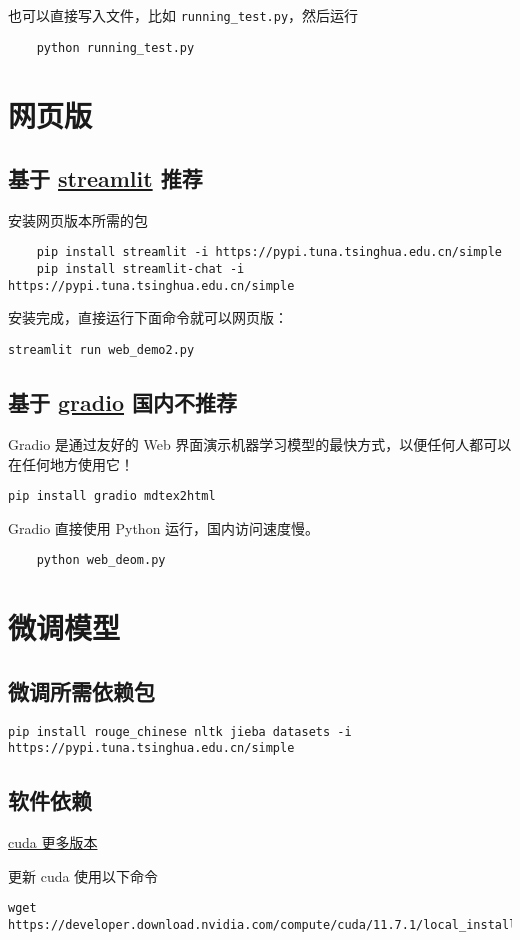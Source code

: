 \documentclass{article}
\begin{document}
也可以直接写入文件，比如 \verb|running_test.py|，然后运行
\begin{verbatim}
    python running_test.py
\end{verbatim}

\section{网页版}
\subsection{基于 \href{https://streamlit.io/}{streamlit} 推荐}
安装网页版本所需的包
\begin{verbatim}
    pip install streamlit -i https://pypi.tuna.tsinghua.edu.cn/simple
    pip install streamlit-chat -i https://pypi.tuna.tsinghua.edu.cn/simple
\end{verbatim}

安装完成，直接运行下面命令就可以网页版：

\verb|streamlit run web_demo2.py|

\subsection{基于 \href{https://www.gradio.app/}{gradio} 国内不推荐}
Gradio 是通过友好的 Web 界面演示机器学习模型的最快方式，以便任何人都可以在任何地方使用它！

\verb|pip install gradio mdtex2html|

Gradio 直接使用 Python 运行，国内访问速度慢。
\begin{verbatim}
    python web_deom.py
\end{verbatim}

\section{微调模型}
\subsection{微调所需依赖包}
\verb|pip install rouge_chinese nltk jieba datasets -i https://pypi.tuna.tsinghua.edu.cn/simple|
\subsection{软件依赖}
\href{https://developer.nvidia.com/cuda-toolkit-archive}{cuda 更多版本}

更新 cuda 使用以下命令
\begin{verbatim}
wget https://developer.download.nvidia.com/compute/cuda/11.7.1/local_installers/cuda_11.7.1_515.65.01_linux.run|
\end{verbatim}
\end{document}
